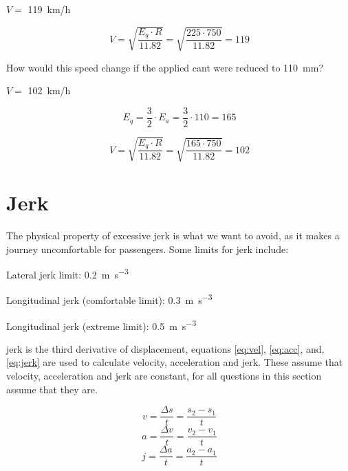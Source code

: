 \documentclass{bcrre_exam}
\begin{document}
\begin{questions}
\begin{solution}
    $V=$ \qty{119}{km/h}
    
    \begin{equation}
        V=\sqrt{\frac{E_q \cdot R}{11.82}}=\sqrt{\frac{225 \cdot 750}{11.82}}=119
    \end{equation}
\end{solution}

\question
How would this speed change if the applied cant were reduced to \qty{110}{mm}?

\begin{solution}
    $V=$ \qty{102}{km/h}

    \begin{equation}
        E_q = \frac{3}{2} \cdot E_a = \frac{3}{2} \cdot 110 = 165
    \end{equation}
    
    \begin{equation}
        V=\sqrt{\frac{E_q \cdot R}{11.82}}=\sqrt{\frac{165 \cdot 750}{11.82}}=102
    \end{equation}
\end{solution}

\end{questions}

\newpage
\section{Jerk} 

The physical property of excessive jerk is what we want to avoid, as it makes a journey uncomfortable for passengers. Some limits for jerk include:

Lateral jerk limit: \qty{0.2}{\meter \per \second \cubed}

Longitudinal jerk (comfortable limit): \qty{0.3}{\meter \per \second \cubed}

Longitudinal jerk (extreme limit): \qty{0.5}{\meter \per \second \cubed}

jerk is the third derivative of displacement, equations \ref{eq:vel}, \ref{eq:acc}, and, \ref{eq:jerk} are used to calculate velocity, acceleration and jerk. These assume that velocity, acceleration and jerk are constant, for all questions in this section assume that they are.

\begin{equation}
    \label{eq:vel}
    v=\frac{\Delta s}{t} = \frac{s_2 - s_1}{t}
\end{equation}
\begin{equation}
\label{eq:acc}
    a=\frac{\Delta v}{t} = \frac{v_2 - v_1}{t}
\end{equation}
\begin{equation}
\label{eq:jerk}
    j=\frac{\Delta a}{t} = \frac{a_2 - a_1}{t}
\end{equation}
\end{document}
